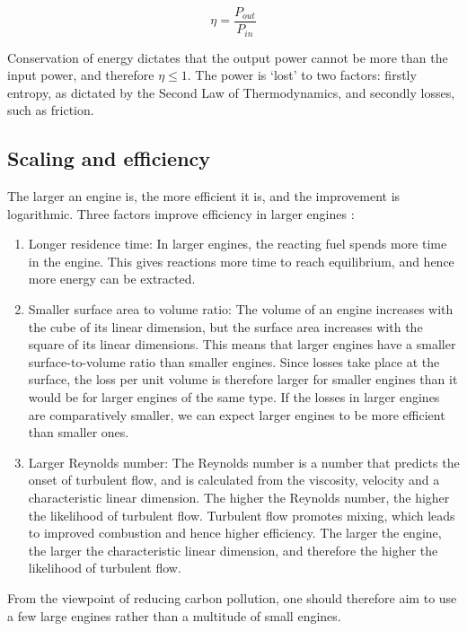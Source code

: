 \[ \eta = \frac{P_{out}}{P_{in}} \]

Conservation of energy dictates that the output power cannot be more than the
input power, and therefore \(\eta \leq 1\). The power is `lost' to two factors:
firstly entropy, as dictated by the Second Law of Thermodynamics, and secondly
losses, such as friction.

\subsection{Scaling and efficiency} \label{par:scaling}

The larger an engine is, the more efficient it is, and the improvement is
logarithmic. Three factors improve efficiency in larger engines
\autocite{Brown2017}:

\begin{enumerate}

\item Longer residence time: In larger engines, the reacting fuel spends more
time in the engine. This gives reactions more time to reach equilibrium, and
hence more energy can be extracted.

\item Smaller surface area to volume ratio: The volume of an engine increases
with the cube of its linear dimension, but the surface area increases with the
square of its linear dimensions. This means that larger engines have a smaller
surface-to-volume ratio than smaller engines. Since losses take place at the
surface, the loss per unit volume is therefore larger for smaller engines than
it would be for larger engines of the same type. If the losses in larger engines
are comparatively smaller, we can expect larger engines to be more
efficient than smaller ones. 
  
\item Larger Reynolds number: The Reynolds number is a number that predicts the
onset of turbulent flow, and is calculated from the viscosity, velocity and a
characteristic linear dimension.  The higher the Reynolds number, the higher the
likelihood of turbulent flow. Turbulent flow promotes mixing, which leads to
improved combustion and hence higher efficiency. The larger the engine, the
larger the characteristic linear dimension, and therefore the higher the
likelihood of turbulent flow.

\end{enumerate}

From the viewpoint of reducing carbon pollution, one should therefore aim to use
a few large engines rather than a multitude of small engines.

